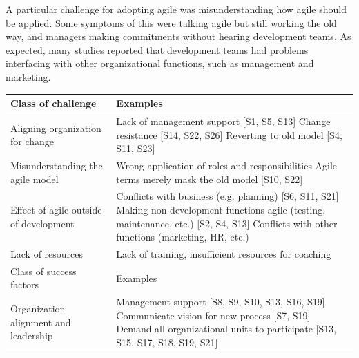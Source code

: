 \documentclass[lnbip]{svmultln}
\begin{document}
A particular challenge for adopting agile was misunderstanding how agile should
be applied. Some symptoms of this were talking agile but still working the old
way, and managers making commitments without hearing development teams.
As expected, many studies reported that development teams had problems
interfacing with other organizational functions, such as management and
marketing.

\begin{table}[h]
    \begin{tabular}{ p{} p{} }
        \toprule
        Class of challenge  & Examples   \\ \midrule
        
        \raggedright Aligning organization for change  &
             Lack of management support [S1, S5, S13]\newline
             Change resistance [S14, S22, S26] \newline
             Reverting to old model [S4, S11, S23] \\ 
        
        \raggedright\rule{0pt}{0.4cm}Misunderstanding the agile model  &
             Wrong application of roles and responsibilities \newline
             [S11, S13, S16, S17, S23, S24] \newline
             Agile terms merely mask the old model [S10, S22] \\
        
        \raggedright\rule{0pt}{0.4cm}Effect of agile outside of development  &
            Conflicts with business (e.g. planning) [S6, S11, S21] \newline
            Making non-development functions agile (testing, maintenance, etc.) [S2, S4, S13]\newline
            Conflicts with other functions (marketing, HR, etc.) \newline[S6, S10, S11, S13] \\
        
        \raggedright\rule{0pt}{0.4cm}Lack of resources  &
            Lack of training, insufficient resources for coaching \newline
            [S5, S13, S22, S28]\\
        
        \midrule
        Class of success factors  & Examples   \\ \midrule
        
        \raggedright Organization alignment and leadership  &
             Management support [S8, S9, S10, S13, S16, S19] \newline
             Communicate vision for new process [S7, S19] \newline
             Demand all organizational units to participate [S13, S15, S17, S18, S19, S21] \\ 
        

\end{tabular}
\end{table}
\end{document}
